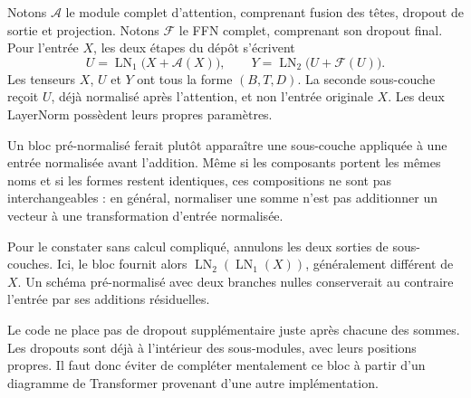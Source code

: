 



Notons $\mathcal A$ le module complet d'attention, comprenant fusion des têtes, dropout de sortie et projection. Notons $\mathcal F$ le FFN complet, comprenant son dropout final. Pour l'entrée $X$, les deux étapes du dépôt s'écrivent
\[
 U=\operatorname{LN}_1\bigl(X+\mathcal A(X)\bigr),
 \qquad
 Y=\operatorname{LN}_2\bigl(U+\mathcal F(U)\bigr).
\]
Les tenseurs $X$, $U$ et $Y$ ont tous la forme $(B,T,D)$. La seconde sous-couche reçoit $U$, déjà normalisé après l'attention, et non l'entrée originale $X$. Les deux LayerNorm possèdent leurs propres paramètres.

Un bloc pré-normalisé ferait plutôt apparaître une sous-couche appliquée à une entrée normalisée avant l'addition. Même si les composants portent les mêmes noms et si les formes restent identiques, ces compositions ne sont pas interchangeables : en général, normaliser une somme n'est pas additionner un vecteur à une transformation d'entrée normalisée.

Pour le constater sans calcul compliqué, annulons les deux sorties de sous-couches. Ici, le bloc fournit alors $\operatorname{LN}_2(\operatorname{LN}_1(X))$, généralement différent de $X$. Un schéma pré-normalisé avec deux branches nulles conserverait au contraire l'entrée par ses additions résiduelles.

Le code ne place pas de dropout supplémentaire juste après chacune des sommes. Les dropouts sont déjà à l'intérieur des sous-modules, avec leurs positions propres. Il faut donc éviter de compléter mentalement ce bloc à partir d'un diagramme de Transformer provenant d'une autre implémentation.

